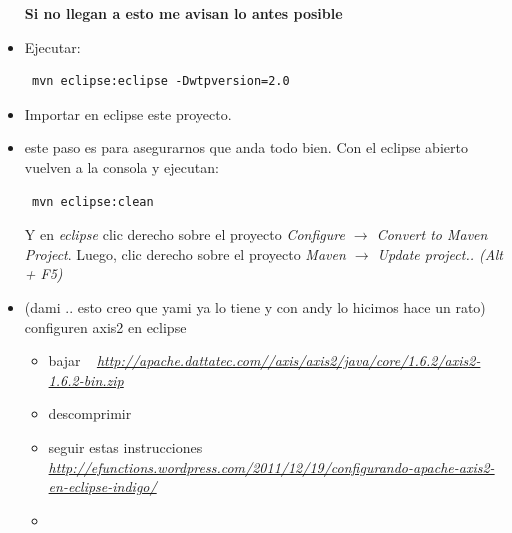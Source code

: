 \documentclass[12pt]{article}
\begin{document}
\begin{itemize}
\begin{minipage}[t]{\linewidth}
          \medskip
          \textbf{Si no llegan a esto me avisan lo antes posible}
    \end{minipage}
\item Ejecutar: %
\begin{verbatim}
 mvn eclipse:eclipse -Dwtpversion=2.0
\end{verbatim}
\item Importar en eclipse este proyecto.
\item este paso es para asegurarnos que anda todo bien. Con el eclipse abierto vuelven a la consola y ejecutan:
\begin{verbatim}
 mvn eclipse:clean
\end{verbatim}
Y en \emph{eclipse} clic derecho sobre el proyecto \emph{Configure $\rightarrow$ Convert to Maven Project}. \newline
Luego, clic derecho sobre el proyecto \emph{Maven $\rightarrow$ Update project.. (Alt + F5) }
\item (dami .. esto creo que yami ya lo tiene y con andy lo hicimos hace un rato) configuren axis2 en eclipse \ \newline
\begin{itemize}
\item bajar  \ \newline
 \textit{\href{http://apache.dattatec.com//axis/axis2/java/core/1.6.2/axis2-1.6.2-bin.zip} {http://apache.dattatec.com//axis/axis2/java/core/1.6.2/axis2-1.6.2-bin.zip}}
\item  descomprimir 
\item seguir estas instrucciones  \ \newline
\textit{\href{http://efunctions.wordpress.com/2011/12/19/configurando-apache-axis2-en-eclipse-indigo/} {http://efunctions.wordpress.com/2011/12/19/configurando-apache-axis2-en-eclipse-indigo/}}
\item \begin{minipage}[t]{\linewidth}
          \raggedright
\end{minipage}
\end{itemize}
\end{itemize}
\end{document}
